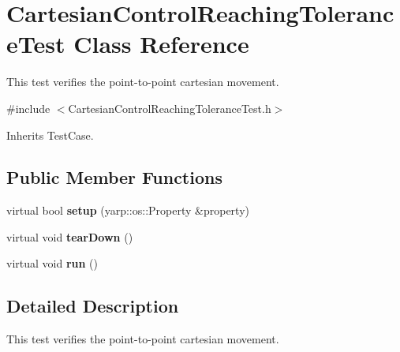 \section{Cartesian\+Control\+Reaching\+Tolerance\+Test Class Reference}
\label{classCartesianControlReachingToleranceTest}


This test verifies the point-\/to-\/point cartesian movement.  




{\ttfamily \#include $<$Cartesian\+Control\+Reaching\+Tolerance\+Test.\+h$>$}



Inherits Test\+Case.

\subsection*{Public Member Functions}
\begin{DoxyCompactItemize}
\item 
\mbox{\label{classCartesianControlReachingToleranceTest_a305952143966c0f4d96cd80398d1ca12}} 
virtual bool {\bfseries setup} (yarp\+::os\+::\+Property \&property)
\item 
\mbox{\label{classCartesianControlReachingToleranceTest_a17e31164ca9d1f4e3fc4f81e0555eec4}} 
virtual void {\bfseries tear\+Down} ()
\item 
\mbox{\label{classCartesianControlReachingToleranceTest_aa76ce8eec92f87b62b7d3bc479e3f184}} 
virtual void {\bfseries run} ()
\end{DoxyCompactItemize}


\subsection{Detailed Description}
This test verifies the point-\/to-\/point cartesian movement. 

